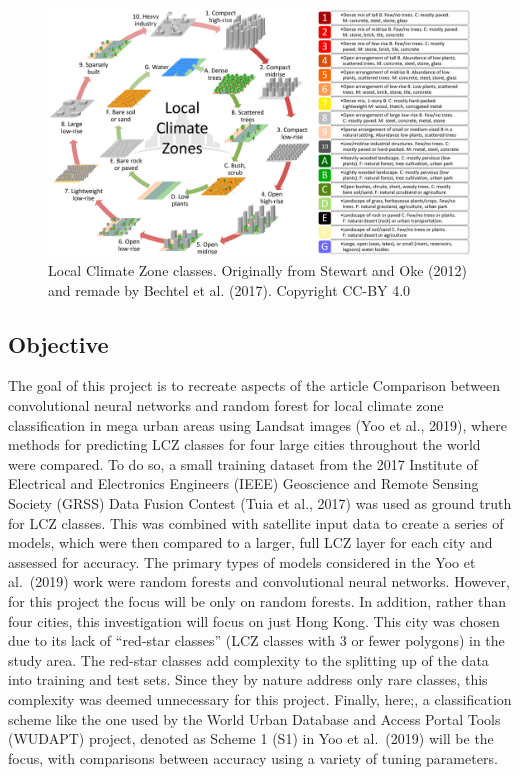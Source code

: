 \documentclass[
]{article}
\begin{document}
\begin{figure}[H]

{\centering \includegraphics[width=1\linewidth]{figure_from_Bechtel_et_al_Stewart_Oke_cc-by4} 

}

\caption{Local Climate Zone classes. Originally from Stewart and Oke (2012) and remade by Bechtel et al. (2017). Copyright CC-BY 4.0}\label{fig:image-ref-for-in-text0}
\end{figure}

\hypertarget{objective}{%
\subsection{Objective}\label{objective}}

The goal of this project is to recreate aspects of the article
Comparison between convolutional neural networks and random forest for
local climate zone classification in mega urban areas using Landsat
images (Yoo et al., 2019), where methods for predicting LCZ classes for
four large cities throughout the world were compared. To do so, a small
training dataset from the 2017 Institute of Electrical and Electronics
Engineers (IEEE) Geoscience and Remote Sensing Society (GRSS) Data
Fusion Contest (Tuia et al., 2017) was used as ground truth for LCZ
classes. This was combined with satellite input data to create a series
of models, which were then compared to a larger, full LCZ layer for each
city and assessed for accuracy. The primary types of models considered
in the Yoo et al.~(2019) work were random forests and convolutional
neural networks. However, for this project the focus will be only on
random forests. In addition, rather than four cities, this investigation
will focus on just Hong Kong. This city was chosen due to its lack of
``red-star classes'' (LCZ classes with 3 or fewer polygons) in the study
area. The red-star classes add complexity to the splitting up of the
data into training and test sets. Since they by nature address only rare
classes, this complexity was deemed unnecessary for this project.
Finally, here;, a classification scheme like the one used by the World
Urban Database and Access Portal Tools (WUDAPT) project, denoted as
Scheme 1 (S1) in Yoo et al.~(2019) will be the focus, with comparisons
between accuracy using a variety of tuning parameters.
\end{document}
